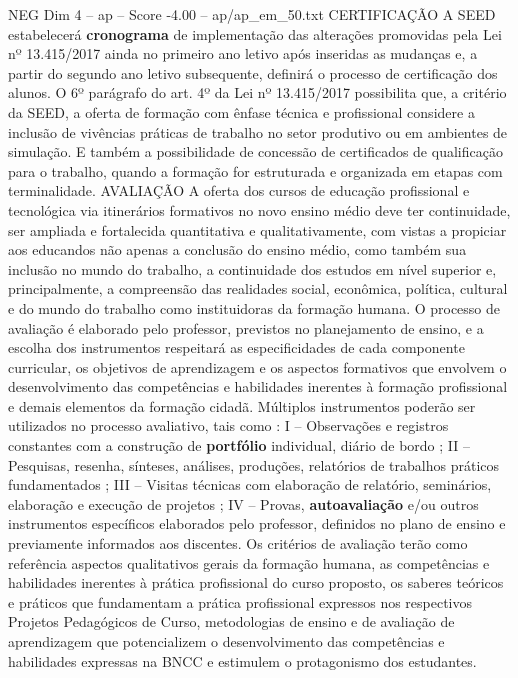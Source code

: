 \begin{textsample}{NEG Dim 4 – ap – Score -4.00 – ap/ap\_em\_50.txt}  \label{ex:f4_neg_052}
CERTIFICAÇÃO A SEED estabelecerá \textbf{cronograma} de implementação das alterações promovidas pela Lei nº 13.415/2017 ainda no primeiro ano letivo após inseridas as mudanças e, a partir do segundo ano letivo subsequente, definirá o processo de certificação dos alunos.
O 6º parágrafo do art. 4º da Lei nº 13.415/2017 possibilita que, a critério da SEED, a oferta de formação com ênfase técnica e profissional considere a inclusão de vivências práticas de trabalho no setor produtivo ou em ambientes de simulação.
E também a possibilidade de concessão de certificados de qualificação para o trabalho, quando a formação for estruturada e organizada em etapas com terminalidade.
AVALIAÇÃO A oferta dos cursos de educação profissional e tecnológica via itinerários formativos no novo ensino médio deve ter continuidade, ser ampliada e fortalecida quantitativa e qualitativamente, com vistas a propiciar aos educandos não apenas a conclusão do ensino médio, como também sua inclusão no mundo do trabalho, a continuidade dos estudos em nível superior e, principalmente, a compreensão das realidades social, econômica, política, cultural e do mundo do trabalho como instituidoras da formação humana.
O processo de avaliação é elaborado pelo professor, previstos no planejamento de ensino, e a escolha dos instrumentos respeitará as especificidades de cada componente curricular, os objetivos de aprendizagem e os aspectos formativos que envolvem o desenvolvimento das competências e habilidades inerentes à formação profissional e demais elementos da formação cidadã.
Múltiplos instrumentos poderão ser utilizados no processo avaliativo, tais como : I – Observações e registros constantes com a construção de \textbf{portfólio} individual, diário de bordo ; II – Pesquisas, resenha, sínteses, análises, produções, relatórios de trabalhos práticos fundamentados ; III – Visitas técnicas com elaboração de relatório, seminários, elaboração e execução de projetos ; IV – Provas, \textbf{autoavaliação} e/ou outros instrumentos específicos elaborados pelo professor, definidos no plano de ensino e previamente informados aos discentes.
Os critérios de avaliação terão como referência aspectos qualitativos gerais da formação humana, as competências e habilidades inerentes à prática profissional do curso proposto, os saberes teóricos e práticos que fundamentam a prática profissional expressos nos respectivos Projetos Pedagógicos de Curso, metodologias de ensino e de avaliação de aprendizagem que potencializem o desenvolvimento das competências e habilidades expressas na BNCC e estimulem o protagonismo dos estudantes.

\end{textsample}
